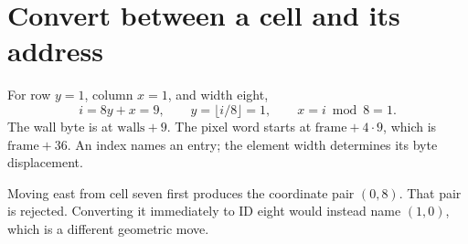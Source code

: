 \section{Convert between a cell and its address}\label{maze-x-index}
For row \(y=1\), column \(x=1\), and width eight,
\[
  i=8y+x=9,\qquad y=\lfloor i/8\rfloor=1,\qquad x=i\bmod8=1.
\]
The wall byte is at \(\text{walls}+9\). The pixel word starts at
\(\text{frame}+4\cdot9\), which is \(\text{frame}+36\).
An index names an entry; the element width determines its byte displacement.

Moving east from cell seven first produces the coordinate pair \((0,8)\).
That pair is rejected. Converting it immediately to ID eight would instead name
\((1,0)\), which is a different geometric move.
